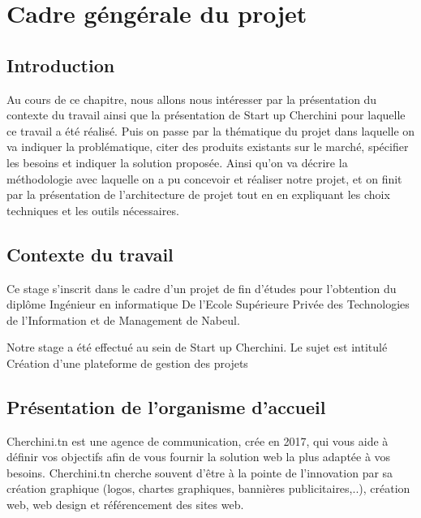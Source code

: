 
\chapter{Cadre g\'{e}ng\'{e}rale du projet}

\section{Introduction}

 Au cours de ce chapitre, nous allons nous int\'{e}resser par la
pr\'{e}sentation du contexte du travail ainsi que la pr\'{e}sentation de Start up
Cherchini pour laquelle ce travail a \'{e}t\'{e} r\'{e}alis\'{e}.
Puis on passe par la th\'{e}matique du projet dans laquelle on va indiquer la
probl\'{e}matique, citer des produits existants sur le march\'{e}, sp\'{e}cifier les besoins
et indiquer la solution propos\'{e}e. Ainsi qu'on va d\'{e}crire la m\'{e}thodologie avec
laquelle on a pu concevoir et r\'{e}aliser notre projet, et on finit par la
pr\'{e}sentation de l'architecture de projet tout en en expliquant les choix
techniques et les outils n\'{e}cessaires.


\section{Contexte du travail}

 Ce stage s'inscrit dans le cadre d'un projet de fin d'\'{e}tudes pour l'obtention du
dipl\^{o}me Ing\'{e}nieur en informatique De l'Ecole Sup\'{e}rieure Priv\'{e}e des
Technologies de l'Information et de Management de Nabeul.

 Notre stage a \'{e}t\'{e} effectu\'{e} au sein de Start up Cherchini.
Le sujet est intitul\'{e} \guillemotleft{}Cr\'{e}ation d'une plateforme de gestion des projets\guillemotright{}




\section{Pr\'{e}sentation  de l'organisme d'accueil}

\bigskip
 Cherchini.tn est une agence de communication, cr\'{e}e en 2017, qui vous aide \`{a}
d\'{e}finir vos objectifs afin de vous fournir la solution web la plus adapt\'{e}e \`{a} vos
besoins. Cherchini.tn cherche souvent d'\^{e}tre \`{a} la pointe de l'innovation par sa
cr\'{e}ation graphique (logos, chartes graphiques, banni\`{e}res publicitaires,..),
cr\'{e}ation web, web design et r\'{e}f\'{e}rencement des sites web.

